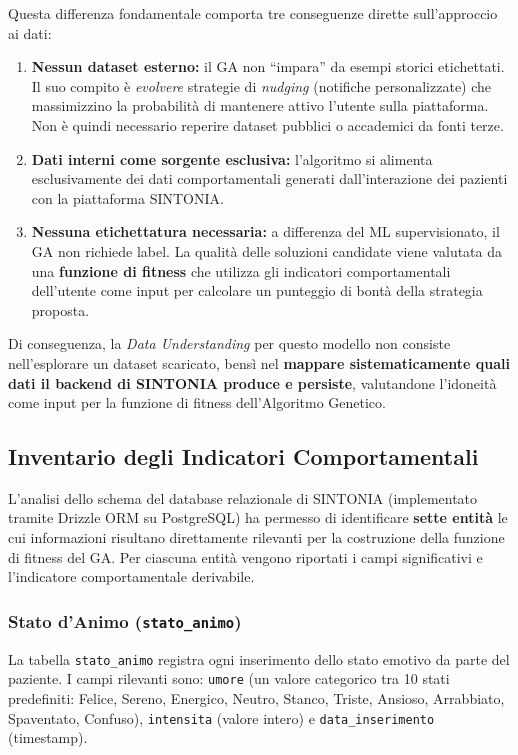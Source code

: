 Questa differenza fondamentale comporta tre conseguenze dirette sull'approccio ai dati:
\begin{enumerate}
    \item \textbf{Nessun dataset esterno:} il GA non ``impara'' da esempi storici etichettati. Il suo compito è \textit{evolvere} strategie di \textit{nudging} (notifiche personalizzate) che massimizzino la probabilità di mantenere attivo l'utente sulla piattaforma. Non è quindi necessario reperire dataset pubblici o accademici da fonti terze.
    \item \textbf{Dati interni come sorgente esclusiva:} l'algoritmo si alimenta esclusivamente dei dati comportamentali generati dall'interazione dei pazienti con la piattaforma SINTONIA.
    \item \textbf{Nessuna etichettatura necessaria:} a differenza del ML supervisionato, il GA non richiede label. La qualità delle soluzioni candidate viene valutata da una \textbf{funzione di fitness} che utilizza gli indicatori comportamentali dell'utente come input per calcolare un punteggio di bontà della strategia proposta.
\end{enumerate}

Di conseguenza, la \textit{Data Understanding} per questo modello non consiste nell'esplorare un dataset scaricato, bensì nel \textbf{mappare sistematicamente quali dati il backend di SINTONIA produce e persiste}, valutandone l'idoneità come input per la funzione di fitness dell'Algoritmo Genetico.

\subsection{Inventario degli Indicatori Comportamentali}
\label{subsec:inventario_indicatori}

L'analisi dello schema del database relazionale di SINTONIA (implementato tramite Drizzle ORM su PostgreSQL) ha permesso di identificare \textbf{sette entità} le cui informazioni risultano direttamente rilevanti per la costruzione della funzione di fitness del GA. Per ciascuna entità vengono riportati i campi significativi e l'indicatore comportamentale derivabile.

\subsubsection{Stato d'Animo (\texttt{stato\_animo})}

La tabella \texttt{stato\_animo} registra ogni inserimento dello stato emotivo da parte del paziente. I campi rilevanti sono: \texttt{umore} (un valore categorico tra 10 stati predefiniti: Felice, Sereno, Energico, Neutro, Stanco, Triste, Ansioso, Arrabbiato, Spaventato, Confuso), \texttt{intensita} (valore intero) e \texttt{data\_inserimento} (timestamp).

